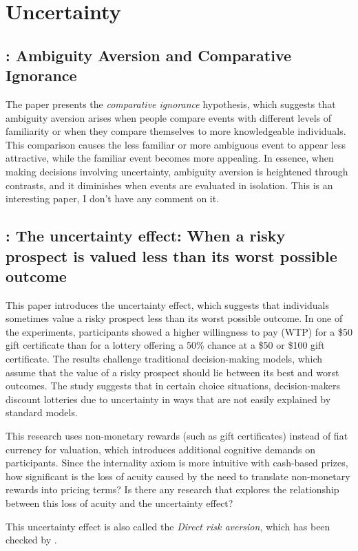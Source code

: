 \documentclass[11pt]{elegantbook}
\begin{document}
\chapter{Uncertainty}
\section{\cite{fox1995ambiguity}: Ambiguity Aversion and Comparative Ignorance}
The paper presents the \textit{comparative ignorance} hypothesis, which suggests that ambiguity aversion arises when people compare events with different levels of familiarity or when they compare themselves to more knowledgeable individuals. This comparison causes the less familiar or more ambiguous event to appear less attractive, while the familiar event becomes more appealing. In essence, when making decisions involving uncertainty, ambiguity aversion is heightened through contrasts, and it diminishes when events are evaluated in isolation. This is an interesting paper, I don’t have any comment on it.


\section{\cite{gneezy2006uncertainty}: The uncertainty effect: When a risky prospect is valued less than its worst possible outcome}
This paper introduces the uncertainty effect, which suggests that individuals sometimes value a risky prospect less than its worst possible outcome. In one of the experiments, participants showed a higher willingness to pay (WTP) for a \$50 gift certificate than for a lottery offering a 50\% chance at a \$50 or \$100 gift certificate. The results challenge traditional decision-making models, which assume that the value of a risky prospect should lie between its best and worst outcomes. The study suggests that in certain choice situations, decision-makers discount lotteries due to uncertainty in ways that are not easily explained by standard models.

This research uses non-monetary rewards (such as gift certificates) instead of fiat currency for valuation, which introduces additional cognitive demands on participants. Since the internality axiom is more intuitive with cash-based prizes, how significant is the loss of acuity caused by the need to translate non-monetary rewards into pricing terms? Is there any research that explores the relationship between this loss of acuity and the uncertainty effect?

This uncertainty effect is also called the \textit{Direct risk aversion}, which has been checked by \cite{simonsohn2009direct}.
\end{document}
